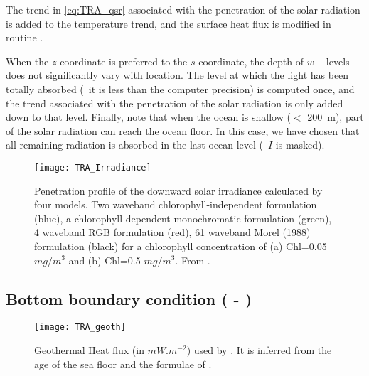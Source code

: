 \documentclass[../main/NEMO_manual]{subfiles}
\begin{document}
The trend in \autoref{eq:TRA_qsr} associated with the penetration of the solar radiation is added to
the temperature trend, and the surface heat flux is modified in routine .

When the $z$-coordinate is preferred to the $s$-coordinate,
the depth of $w-$levels does not significantly vary with location.
The level at which the light has been totally absorbed
(\ie\ it is less than the computer precision) is computed once,
and the trend associated with the penetration of the solar radiation is only added down to that level.
Finally, note that when the ocean is shallow ($<$ 200~m),
part of the solar radiation can reach the ocean floor.
In this case, we have chosen that all remaining radiation is absorbed in the last ocean level
(\ie\ $I$ is masked).

\begin{figure}
  \centering
  \texttt{[image: TRA\_Irradiance]}
  \caption[Penetration profile of the downward solar irradiance calculated by four models]{
    Penetration profile of the downward solar irradiance calculated by four models.
    Two waveband chlorophyll-independent formulation (blue),
    a chlorophyll-dependent monochromatic formulation (green),
    4 waveband RGB formulation (red),
    61 waveband Morel (1988) formulation (black) for a chlorophyll concentration of
    (a) Chl=0.05 $mg/m^3$ and (b) Chl=0.5 $mg/m^3$.
    From \citet{lengaigne.menkes.ea_CD07}.}
  \label{fig:TRA_qsr_irradiance}
\end{figure}

\subsection[Bottom boundary condition (\textit{trabbc.F90}) - \forcode{ln_trabbc})]{Bottom boundary condition (\protect{} - \protect{})}
\label{subsec:TRA_bbc}

\begin{listing}
  \caption{}
  \label{lst:nambbc}
\end{listing}

\begin{figure}
  \centering
  \texttt{[image: TRA\_geoth]}
  \caption[Geothermal heat flux]{
    Geothermal Heat flux (in $mW.m^{-2}$) used by \cite{emile-geay.madec_OS09}.
    It is inferred from the age of the sea floor and the formulae of \citet{stein.stein_N92}.}
  \label{fig:TRA_geothermal}
\end{figure}
\end{document}
